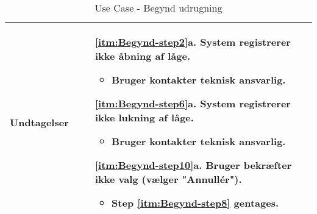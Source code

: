 \begin{table}[H]
\begin{tabular}[\textwidth]{|p{}|p{}|}
	\hline Undtagelser &
	\begin{enumerate}
	\item[\ref{itm:Begynd-step2}a.] System registrerer ikke åbning af låge. 
	\begin{itemize}
	\item Bruger kontakter teknisk ansvarlig. 
	\end{itemize}
	\item[\ref{itm:Begynd-step6}a.] System registrerer ikke lukning af låge.  
	\begin{itemize}
	\item Bruger kontakter teknisk ansvarlig. 
	\end{itemize}
	\item[\ref{itm:Begynd-step10}a.] Bruger bekræfter ikke valg (vælger "Annullér"). 
	\begin{itemize}
	\item Step \ref{itm:Begynd-step8} gentages.
	\end{itemize}
	\end{enumerate} \\
\hline 
\end{tabular}
\caption{Use Case - Begynd udrugning}
\label{tab:usecase-Begynd-udrugning}
\end{table}